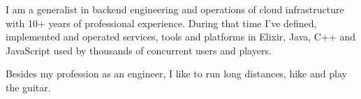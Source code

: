 

\begin{cvparagraph}

I am a generalist in backend engineering and operations of cloud infrastructure with 10+ years of professional experience. During that time I've defined, implemented and operated services, tools and platforms in Elixir, Java, C++ and JavaScript used by thousands of concurrent users and players. 

Besides my profession as an engineer, I like to run long distances, hike and play the guitar.

\end{cvparagraph}

